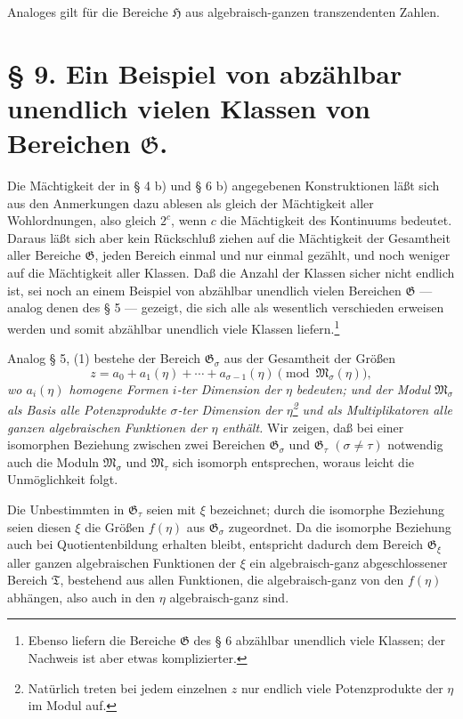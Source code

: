 \documentclass[11pt]{article}
\begin{document}
Analoges gilt für die Bereiche $\mathfrak H$ aus algebraisch-ganzen
transzendenten Zahlen.

\section*{§ 9. Ein Beispiel von abzählbar unendlich vielen Klassen von Bereichen $\mathfrak G$.}

Die Mächtigkeit der in § 4 b) und § 6 b) angegebenen Konstruktionen läßt sich
aus den Anmerkungen dazu ablesen als gleich der Mächtigkeit aller Wohlordnungen,
also gleich $2^c$, wenn $c$ die Mächtigkeit des Kontinuums bedeutet. Daraus läßt
sich aber kein Rückschluß ziehen auf die Mächtigkeit der Gesamtheit aller
Bereiche $\mathfrak G$, jeden Bereich einmal und nur einmal gezählt, und noch
weniger auf die Mächtigkeit aller Klassen. Daß die Anzahl der Klassen sicher
nicht endlich ist, sei noch an einem Beispiel von abzählbar unendlich vielen
Bereichen $\mathfrak G$ --- analog denen des § 5 --- gezeigt, die sich alle als
wesentlich verschieden erweisen werden und somit abzählbar unendlich viele
Klassen liefern.\footnote{Ebenso liefern die Bereiche $\mathfrak G$ des § 6
abzählbar unendlich viele Klassen; der Nachweis ist aber etwas komplizierter.}

Analog § 5, (1) bestehe der Bereich $\mathfrak G_\sigma$ aus der Gesamtheit der
Größen
\begin{equation}
 z=a_0+a_1(\eta)+\cdots+a_{\sigma-1}(\eta)
 \pmod{\mathfrak M_\sigma(\eta)},
\tag{1}
\end{equation}
\emph{wo $a_i(\eta)$ homogene Formen $i$-ter Dimension der $\eta$ bedeuten; und
der Modul $\mathfrak M_\sigma$ als Basis alle Potenzprodukte $\sigma$-ter
Dimension der $\eta$\footnote{Natürlich treten bei jedem einzelnen $z$ nur
endlich viele Potenzprodukte der $\eta$ im Modul auf.} und als Multiplikatoren
alle ganzen algebraischen Funktionen der $\eta$ enthält.} Wir zeigen, daß bei
einer isomorphen Beziehung zwischen zwei Bereichen $\mathfrak G_\sigma$ und
$\mathfrak G_\tau$ $(\sigma\ne\tau)$ notwendig auch die Moduln
$\mathfrak M_\sigma$ und $\mathfrak M_\tau$ sich isomorph entsprechen, woraus
leicht die Unmöglichkeit folgt.

Die Unbestimmten in $\mathfrak G_\tau$ seien mit $\xi$ bezeichnet; durch die
isomorphe Beziehung seien diesen $\xi$ die Größen $f(\eta)$ aus
$\mathfrak G_\sigma$ zugeordnet. Da die isomorphe Beziehung auch bei
Quotientenbildung erhalten bleibt, entspricht dadurch dem Bereich
$\mathfrak G_\xi$ aller ganzen algebraischen Funktionen der $\xi$ ein
algebraisch-ganz abgeschlossener Bereich $\mathfrak T$, bestehend aus allen
Funktionen, die algebraisch-ganz von den $f(\eta)$ abhängen, also auch in den
$\eta$ algebraisch-ganz sind.
\end{document}
